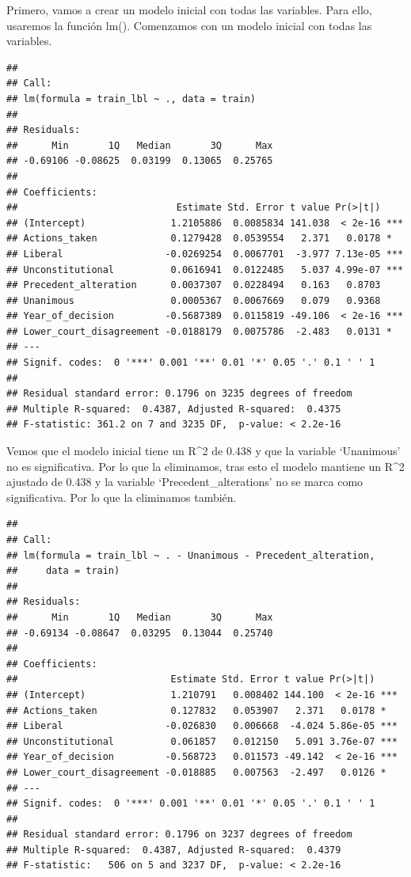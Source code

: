 \documentclass[
]{article}
\begin{document}
Primero, vamos a crear un modelo inicial con todas las variables. Para
ello, usaremos la función lm(). Comenzamos con un modelo inicial con
todas las variables.

\begin{verbatim}
## 
## Call:
## lm(formula = train_lbl ~ ., data = train)
## 
## Residuals:
##      Min       1Q   Median       3Q      Max 
## -0.69106 -0.08625  0.03199  0.13065  0.25765 
## 
## Coefficients:
##                            Estimate Std. Error t value Pr(>|t|)    
## (Intercept)               1.2105886  0.0085834 141.038  < 2e-16 ***
## Actions_taken             0.1279428  0.0539554   2.371   0.0178 *  
## Liberal                  -0.0269254  0.0067701  -3.977 7.13e-05 ***
## Unconstitutional          0.0616941  0.0122485   5.037 4.99e-07 ***
## Precedent_alteration      0.0037307  0.0228494   0.163   0.8703    
## Unanimous                 0.0005367  0.0067669   0.079   0.9368    
## Year_of_decision         -0.5687389  0.0115819 -49.106  < 2e-16 ***
## Lower_court_disagreement -0.0188179  0.0075786  -2.483   0.0131 *  
## ---
## Signif. codes:  0 '***' 0.001 '**' 0.01 '*' 0.05 '.' 0.1 ' ' 1
## 
## Residual standard error: 0.1796 on 3235 degrees of freedom
## Multiple R-squared:  0.4387, Adjusted R-squared:  0.4375 
## F-statistic: 361.2 on 7 and 3235 DF,  p-value: < 2.2e-16
\end{verbatim}

Vemos que el modelo inicial tiene un R\^{}2 de 0.438 y que la variable
`Unanimous' no es significativa. Por lo que la eliminamos, tras esto el
modelo mantiene un R\^{}2 ajustado de 0.438 y la variable
`Precedent\_alterations' no se marca como significativa. Por lo que la
eliminamos también.

\begin{verbatim}
## 
## Call:
## lm(formula = train_lbl ~ . - Unanimous - Precedent_alteration, 
##     data = train)
## 
## Residuals:
##      Min       1Q   Median       3Q      Max 
## -0.69134 -0.08647  0.03295  0.13044  0.25740 
## 
## Coefficients:
##                           Estimate Std. Error t value Pr(>|t|)    
## (Intercept)               1.210791   0.008402 144.100  < 2e-16 ***
## Actions_taken             0.127832   0.053907   2.371   0.0178 *  
## Liberal                  -0.026830   0.006668  -4.024 5.86e-05 ***
## Unconstitutional          0.061857   0.012150   5.091 3.76e-07 ***
## Year_of_decision         -0.568723   0.011573 -49.142  < 2e-16 ***
## Lower_court_disagreement -0.018885   0.007563  -2.497   0.0126 *  
## ---
## Signif. codes:  0 '***' 0.001 '**' 0.01 '*' 0.05 '.' 0.1 ' ' 1
## 
## Residual standard error: 0.1796 on 3237 degrees of freedom
## Multiple R-squared:  0.4387, Adjusted R-squared:  0.4379 
## F-statistic:   506 on 5 and 3237 DF,  p-value: < 2.2e-16
\end{verbatim}
\end{document}
